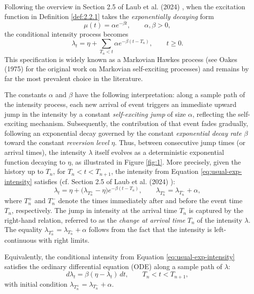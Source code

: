 \documentclass[12pt,a4paper]{report}
\theoremstyle{plain}
\theoremstyle{definition}
\theoremstyle{remark}
\newcommand{\1}{\mathbf{1}}
\begin{document}
\medskip
\noindent
Following the overview in Section 2.5 of Laub et al. (2024) \cite{LLPT24}, when the excitation function in Definition \ref{def:2.2.1} takes the \emph{exponentially decaying} form
\begin{equation}\label{eq:exp-kernel}
\mu(t)=\alpha e^{-\beta t},\qquad \alpha,\beta>0,
\end{equation}
the conditional intensity process becomes
\begin{equation}
    \lambda_t = \eta + \sum_{T_n < t} \alpha e^{-\beta(t-T_n)}, \qquad t\ge0.\label{eq:usual-exp-intensity}
\end{equation}
This specification is widely known as a Markovian Hawkes process (see Oakes (1975) \cite{Oak75} for the original work on Markovian self-exciting processes) and remains by far the most prevalent choice in the literature.

\medskip
\noindent
The constants $\alpha$ and $\beta$ have the following interpretation: along a sample path of the intensity process, each new arrival of event triggers an immediate upward jump in the intensity by a constant \emph{self-exciting jump} of size $\alpha$, reflecting the self-exciting mechanism. Subsequently, the contribution of that event fades gradually, following an exponential decay governed by the constant \emph{exponential decay rate} $\beta$ toward the constant \emph{reversion level} $\eta$. Thus, between consecutive jump times (or arrival times), the intensity $\lambda$ itself evolves as a deterministic exponential function decaying to $\eta$, as illustrated in Figure \ref{fig:1}.
More precisely, given the history up to $T_n$, for $T_n < t < T_{n+1}$, the intensity from Equation \eqref{eq:usual-exp-intensity} satisfies (cf. Section 2.5 of Laub et al. (2024) \cite{LLPT24}):
\begin{equation}\label{eq:exp-recursion}
\lambda_t = \eta + \big(\lambda_{T_n^+} - \eta\big) e^{-\beta (t - T_n)}, \qquad
\lambda_{T_n^+} = \lambda_{T_n^-} + \alpha,
\end{equation}
where $T_n^+$ and $T_n^-$ denote the times immediately after and before the event time $T_n$, respectively. The jump in intensity at the arrival time $T_n$ is captured by the right-hand relation, referred to as the \emph{change at arrival time} $T_n$ of the intensity $\lambda$. The equality $\lambda_{T_n^+} = \lambda_{T_n^-} + \alpha$ follows from the fact that the intensity is left-continuous with right limits.

\medskip
\noindent
Equivalently, the conditional intensity from Equation \eqref{eq:usual-exp-intensity} satisfies the ordinary differential equation (ODE) along a sample path of $\lambda$:
\begin{equation}\label{eq:ode}
d\lambda_t = \beta(\eta - \lambda_t) \, dt, \qquad T_n < t < T_{n+1},
\end{equation}
with initial condition $\lambda_{T_n^+} = \lambda_{T_n^-} + \alpha$.
\end{document}
